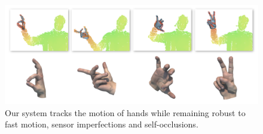 \begin{figure}[H]
\includegraphics[width=\linewidth]{htrack/fig/teaser/teaser.png}
\centering
\caption{Our system tracks the motion of hands while remaining robust to fast motion, sensor imperfections and self-occlusions.}
\end{figure}